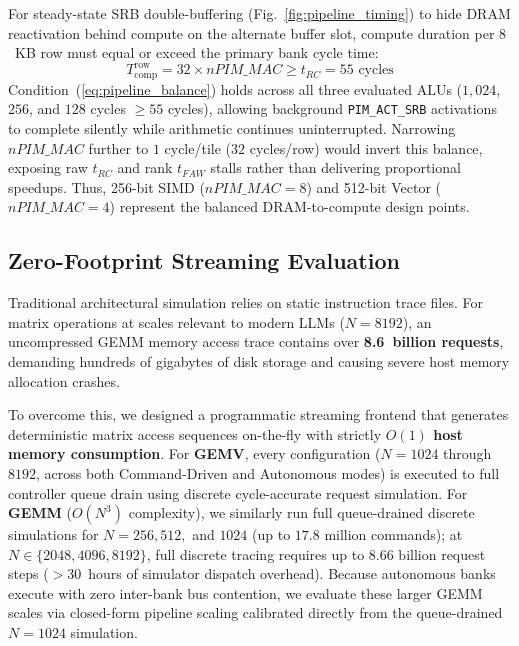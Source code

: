 \documentclass[conference]{IEEEtran}
\begin{document}
For steady-state SRB double-buffering (Fig.~\ref{fig:pipeline_timing}) to hide DRAM reactivation behind compute on the alternate buffer slot, compute duration per $8$~KB row must equal or exceed the primary bank cycle time:
\begin{equation}
    T_{\text{comp}}^{\text{row}} = 32 \times nPIM\_MAC \ge t_{RC} = 55\text{ cycles}
    \label{eq:pipeline_balance}
\end{equation}
Condition~(\ref{eq:pipeline_balance}) holds across all three evaluated ALUs ($1,024$, $256$, and $128$ cycles $\ge 55$ cycles), allowing background \texttt{PIM\_ACT\_SRB} activations to complete silently while arithmetic continues uninterrupted. Narrowing $nPIM\_MAC$ further to $1$ cycle/tile ($32$ cycles/row) would invert this balance, exposing raw $t_{RC}$ and rank $t_{FAW}$ stalls rather than delivering proportional speedups. Thus, 256-bit SIMD ($nPIM\_MAC = 8$) and 512-bit Vector ($nPIM\_MAC = 4$) represent the balanced DRAM-to-compute design points.

\subsection{Zero-Footprint Streaming Evaluation}
Traditional architectural simulation relies on static instruction trace files. For matrix operations at scales relevant to modern LLMs ($N = 8192$), an uncompressed GEMM memory access trace contains over \textbf{8.6~billion requests}, demanding hundreds of gigabytes of disk storage and causing severe host memory allocation crashes. 

To overcome this, we designed a programmatic streaming frontend that generates deterministic matrix access sequences on-the-fly with strictly \textbf{$O(1)$ host memory consumption}. For \textbf{GEMV}, every configuration ($N = 1024$ through $8192$, across both Command-Driven and Autonomous modes) is executed to full controller queue drain using discrete cycle-accurate request simulation. For \textbf{GEMM} ($O(N^3)$ complexity), we similarly run full queue-drained discrete simulations for $N = 256, 512,$ and $1024$ (up to $17.8\text{ million}$ commands); at $N \in \{2048, 4096, 8192\}$, full discrete tracing requires up to $8.66\text{ billion}$ request steps ($>30$~hours of simulator dispatch overhead). Because autonomous banks execute with zero inter-bank bus contention, we evaluate these larger GEMM scales via closed-form pipeline scaling calibrated directly from the queue-drained $N = 1024$ simulation.
\end{document}
